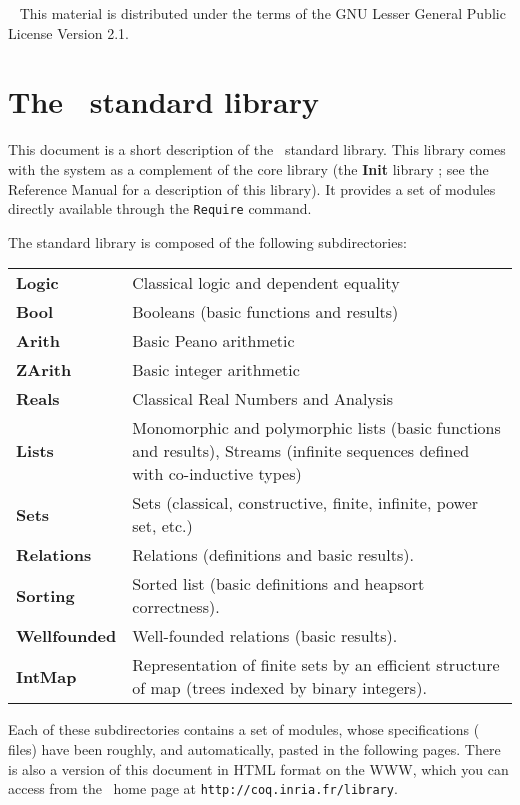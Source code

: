 \documentclass[11pt]{article}
\begin{document}
 
%
{\ }
{This material is distributed under the terms of the GNU Lesser
General Public License Version 2.1.}

\tableofcontents

\newpage
\section*{The \Coq\ standard library}

This document is a short description of the \Coq\ standard library.
This library comes with the system as a complement of the core library
(the {\bf Init} library ; see the Reference Manual for a description
of this library). It provides a set of modules directly available
through the \verb!Require! command.

The standard library is composed of the following subdirectories:
\medskip
\begin{tabular}{lp{12cm}}
  {\bf Logic}   & Classical logic and dependent equality \\
  {\bf Bool}    & Booleans (basic functions and results) \\
  {\bf Arith}   & Basic Peano arithmetic \\
  {\bf ZArith}  & Basic integer arithmetic \\
  {\bf Reals}   & Classical Real Numbers and Analysis \\
  {\bf Lists}   & Monomorphic and polymorphic lists (basic functions and
                  results), Streams (infinite sequences defined 
                  with co-inductive types) \\
  {\bf Sets}    & Sets (classical, constructive, finite, infinite, power set,
                  etc.) \\
  {\bf Relations}   & Relations (definitions and basic results). \\
  {\bf Sorting}  & Sorted list (basic definitions and heapsort correctness). \\
  {\bf Wellfounded} & Well-founded relations (basic results). \\
  {\bf IntMap}      & Representation of finite sets by an efficient
                      structure of map (trees indexed by binary integers).\\

\end{tabular}
\medskip

Each of these subdirectories contains a set of modules, whose
specifications (\gallina{} files) have
been roughly, and automatically, pasted in the following pages. There
is also a version of this document in HTML format on the WWW, which
you can access from the \Coq\ home page at
\texttt{http://coq.inria.fr/library}.


\end{document}
